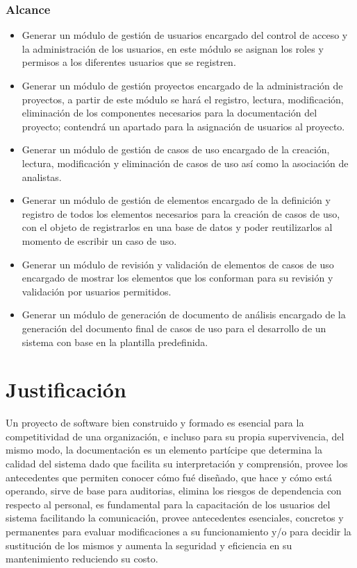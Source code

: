 \subsubsection{Alcance}

\begin{itemize}
	\item Generar un módulo de gestión de usuarios encargado del control de acceso y la administración de los usuarios, en este módulo se asignan los roles y permisos a los diferentes usuarios que se registren.
	\item Generar un módulo de gestión proyectos encargado de la administración de proyectos, a partir de este módulo se hará el registro, lectura, modificación, eliminación de los componentes necesarios para la documentación del proyecto; contendrá un apartado para la asignación de usuarios al proyecto.
	\item Generar un módulo de gestión de casos de uso encargado de la creación, lectura, modificación y eliminación de casos de uso así como la asociación de analistas.
	\item Generar un módulo de gestión de elementos encargado de la definición y registro de todos los elementos necesarios para la creación de casos de uso, con el objeto de registrarlos en una base de datos y poder reutilizarlos al momento de escribir un caso de uso.
	\item Generar un módulo de revisión y validación de elementos de casos de uso encargado de mostrar los elementos que los conforman para su revisión y validación por usuarios permitidos.
	\item Generar un módulo de generación de documento de análisis encargado de la generación del documento final de casos de uso para el desarrollo de un sistema con base en la plantilla predefinida.

\end{itemize}


\section{Justificación}
Un proyecto de software bien construido y formado es esencial para la competitividad de una organización, e incluso para su propia supervivencia, del mismo modo, la documentación es un elemento partícipe que determina la calidad del sistema dado que facilita su interpretación y comprensión, provee los antecedentes que permiten conocer cómo fué diseñado, que hace y cómo está operando, sirve de base para auditorias, elimina los riesgos de dependencia con respecto al personal, es fundamental para la capacitación de los usuarios del sistema facilitando la comunicación, provee antecedentes esenciales, concretos y permanentes para evaluar modificaciones a su funcionamiento y/o para decidir la sustitución de los mismos y aumenta la seguridad y eficiencia en su mantenimiento reduciendo su costo.

